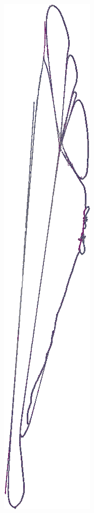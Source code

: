 \begin{figure}[!htb]
\begin{subfigure}[t]{0.1\textwidth}
		\includegraphics[width=\linewidth]{fig/tension/layout.png}

\end{subfigure}
\end{figure}
